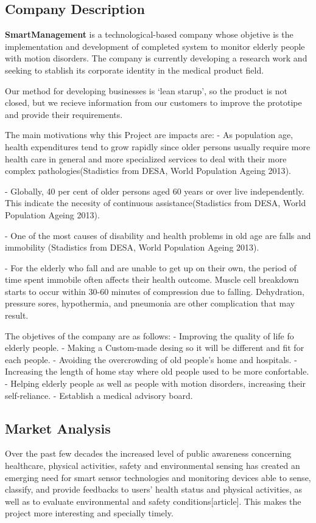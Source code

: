 \subsection{Company Description}
\textbf{SmartManagement} is a technological-based company whose objetive is the implementation and development of completed system to monitor elderly people with motion disorders. The company is currently developing a research work and seeking to stablish its corporate identity in the medical product field.

Our method for developing businesses is ‘lean starup’, so the product is not closed, but we recieve information from our customers to improve the prototipe and provide their requirements.

The main motivations why this Project are impacts are:
-	As population age, health expenditures tend to grow rapidly since older persons usually require more health care in general and more specialized services to deal with their more complex pathologies(Stadistics from DESA,  World Population Ageing 2013\cite{desa}).

-	Globally, 40 per cent of older persons aged 60 years or over live independently. This indicate the necesity of continuous assistance(Stadistics from DESA,  World Population Ageing 2013\cite{desa}).

-	One of the most causes of disability and health problems in old age are falls and immobility (Stadistics from DESA,  World Population Ageing 2013\cite{desa}).

-	For the elderly who fall and are unable to get up on their own, the period of time spent immobile often affects their health outcome. Muscle cell breakdown starts to occur within 30-60 minutes of compression due to falling. Dehydration, pressure sores, hypothermia, and pneumonia are other complication that may result\cite{A.Olivares2013}.

The objetives of the company are as follows:
-	Improving the quality of life fo elderly people.
-	Making a Custom-made desing so it will be different and fit for each people.
-	Avoiding the overcrowding of old people’s home and hospitals.
-	Increasing the length of home stay where old people used to be more confortable.
-	Helping elderly people as well as people with motion disorders, increasing their self-reliance.
-	Establish a medical advisory board.

\subsection{Market Analysis}
 Over the past few decades the increased level of public awareness concerning healthcare, physical activities, safety and environmental sensing has created an emerging need for smart sensor technologies and monitoring devices able to sense, classify, and provide feedbacks to users’ health status and physical activities, as well as to evaluate environmental and safety conditions[article]. This makes the project more interesting and specially timely.
 

